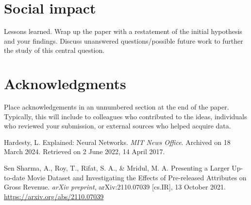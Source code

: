 \documentclass{article}
\begin{document}
\section{Social impact}
\label{conclusion}

Lessons learned.  Wrap up the paper with a restatement of the initial hypothesis
and your findings.  Discuss unanswered questions/possible future work to further
the study of this central question.

\section*{Acknowledgments}


Place acknowledgements in an unnumbered section at the
end of the paper. Typically, this will include
to colleagues who contributed to the ideas, individuals who
reviewed your submission, or external sources who helped
acquire data.



\begin{hangparas}{.25in}{1} %
\hypertarget{Hardesty2017}{Hardesty, L. Explained: Neural Networks. \textit{MIT News Office}. Archived on 18 March 2024. Retrieved on 2 June 2022, 14 April 2017.}
\end{hangparas}
\begin{hangparas}{.25in}{1}
\hypertarget{SenSharma2021}{Sen Sharma, A., Roy, T., Rifat, S. A., \& Mridul, M. A. Presenting a Larger Up-to-date Movie Dataset and Investigating the Effects of Pre-released Attributes on Gross Revenue. \textit{arXiv preprint}, arXiv:2110.07039 [cs.IR], 13 October 2021. \url{https://arxiv.org/abs/2110.07039}}

\end{hangparas}



\end{document}
